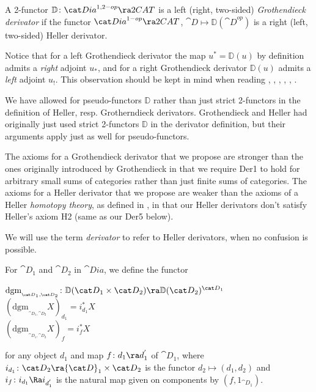 \begin{defn}
\label{defn:grothderivator}
A 2-functor ${\mathbb D} \colon {\cat Dia}^{1,2-op} \ra  2CAT$ is a left (right, two-sided) {\it Grothendieck derivator} if the functor ${\cat Dia}^{1-op} \ra  2CAT$, ${\cat D} \mapsto {\mathbb D}({\cat D}^{op})$ is a right (left, two-sided) Heller derivator.
\end{defn}

Notice that for a left Grothendieck derivator the map $u^* = {\mathbb D}(u)$ by definition admits a {\it right} adjoint $u_*$, and for a right Grothendieck derivator ${\mathbb D}(u)$ admits a {\it left} adjoint $u_!$. This observation should be kept in mind when reading \cite{Grothendieck1}, \cite{Grothendieck2}, \cite{Maltsiniotis1}, \cite{Cisinski2}, \cite{Cisinski3}, \cite{Cisinski4}. 

We have allowed for pseudo-functors ${\mathbb D}$ rather than just strict 2-functors in the definition of Heller, resp. Grotherndieck derivators. Grothendieck and Heller had originally just used strict 2-functors ${\mathbb D}$ in the derivator definition, but their arguments apply just as well for pseudo-functors.

The axioms for a Grothendieck derivator that we propose are stronger than the ones originally introduced by Grothendieck in that we require Der1 to hold for arbitrary small sums of categories rather than just finite sums of categories. The axioms for a Heller derivator that we propose are weaker than the axioms of a Heller {\it homotopy theory}, as defined in \cite{Heller}, in that our Heller derivators don't satisfy Heller's axiom H2 (same as our Der5 below).

We will use the term {\it derivator} to refer to Heller derivators, when no confusion is possible.

For ${\cat D}_1$ and ${\cat D}_2$ in ${\cat Dia}$, we define the functor
\begin{center}
$\mathrm{dgm}_{_{{\cat D}_1, {\cat D}_2}} \colon \mathbb{D}({\cat D}_1 \times {\cat D}_2) \ra \mathbb{D}({\cat D}_2)^{{\cat D}_1}$ \\
$(\mathrm{dgm}_{_{{\cat D}_1, {\cat D}_2}} X)_{d_1} = i_{d_1}^* X$ \\
$(\mathrm{dgm}_{_{{\cat D}_1, {\cat D}_2}} X)_{f} = i_{f}^* X$
\end{center}
for any object $d_1$ and map $f \colon d_1 \ra d^{'}_1$ of ${\cat D}_1$, where $i_{d_1} \colon {\cat D}_2 \ra {\cat D}_1 \times {\cat D}_2$ is the functor $d_2 \mapsto (d_1, d_2)$ and $i_f \colon i_{d_1} \Ra i_{d^{'}_1}$ is the natural map given on components by $(f, 1_{{\cat D}_1})$.


